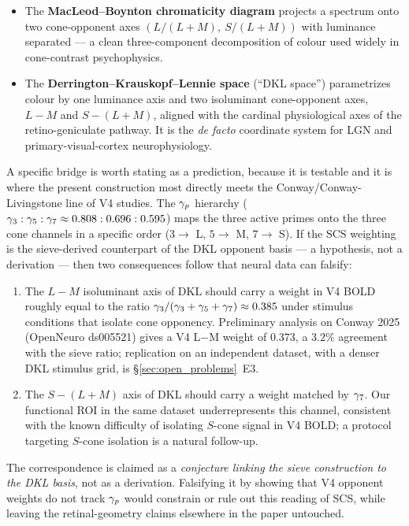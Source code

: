 \documentclass[12pt,a4paper]{article}
\begin{document}
\begin{itemize}[nosep]
\item The \textbf{MacLeod--Boynton chromaticity diagram}
  \cite{macleod1979} projects a spectrum onto two cone-opponent axes
  $(L/(L+M),\ S/(L+M))$ with luminance separated --- a clean
  three-component decomposition of colour used widely in
  cone-contrast psychophysics.
\item The \textbf{Derrington--Krauskopf--Lennie space} \cite{dkl1984}
  (``DKL space'') parametrizes colour by one luminance axis and two
  isoluminant cone-opponent axes, $L{-}M$ and $S{-}(L{+}M)$, aligned
  with the cardinal physiological axes of the retino-geniculate pathway.
  It is the \emph{de facto} coordinate system for LGN and primary-visual-cortex
  neurophysiology.
\end{itemize}

A specific bridge is worth stating as a prediction, because it is
testable and it is where the present construction most directly
meets the Conway/Conway-Livingstone line of V4 studies. The
$\gamma_{p}$ hierarchy ($\gamma_{3} : \gamma_{5} : \gamma_{7} \approx
0.808 : 0.696 : 0.595$) maps the three active primes onto the three
cone channels in a specific order ($3 \to $ L, $5 \to$ M, $7 \to$ S).
If the SCS weighting is the sieve-derived counterpart of the DKL
opponent basis --- a hypothesis, not a derivation --- then two
consequences follow that neural data can falsify:

\begin{enumerate}[nosep]
\item The $L{-}M$ isoluminant axis of DKL should carry a weight in V4
  BOLD roughly equal to the ratio $\gamma_{3}/(\gamma_{3}+\gamma_{5}+\gamma_{7})
  \approx 0.385$ under stimulus conditions that isolate cone
  opponency. Preliminary analysis on Conway 2025 (OpenNeuro
  ds005521) gives a V4 L$-$M weight of $0.373$, a $3.2\%$ agreement
  with the sieve ratio; replication on an independent dataset, with a
  denser DKL stimulus grid, is \S\ref{sec:open_problems}~E3.
\item The $S{-}(L{+}M)$ axis of DKL should carry a weight matched by
  $\gamma_{7}$. Our functional ROI in the same dataset
  underrepresents this channel, consistent with the known
  difficulty of isolating $S$-cone signal in V4 BOLD; a protocol
  targeting $S$-cone isolation is a natural follow-up.
\end{enumerate}

The correspondence is claimed as a \emph{conjecture linking the
sieve construction to the DKL basis}, not as a derivation.
Falsifying it by showing that V4 opponent weights do not track
$\gamma_{p}$ would constrain or rule out this reading of SCS, while
leaving the retinal-geometry claims elsewhere in the paper
untouched.
\end{document}
